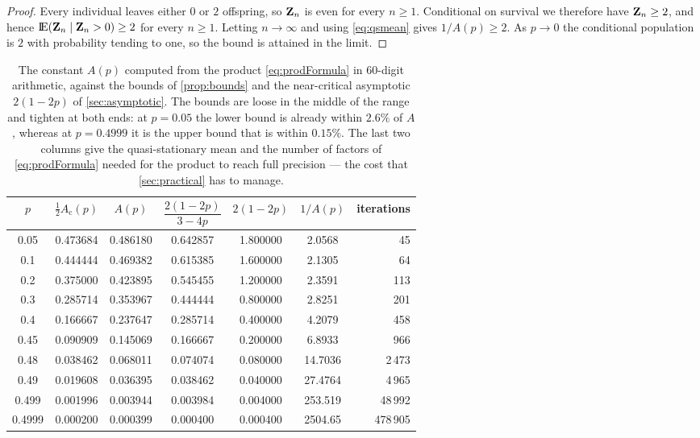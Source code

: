 \begin{proof}
Every individual leaves either $0$ or $2$ offspring, so ${\bf Z}_n$ is even for every
$n\ge1$. Conditional on survival we therefore have ${\bf Z}_n\ge2$, and hence
${\rm I}\!{\rm E}({\bf Z}_n\mid{\bf Z}_n>0)\ge2$ for every $n\ge1$. Letting $n\to\infty$ and using
\cref{eq:qsmean} gives $1/A(p)\ge2$. As $p\to0$ the conditional population is $2$ with
probability tending to one, so the bound is attained in the limit.
\end{proof}

\begin{table}[ht]
\centering
\caption{The constant $A(p)$ computed from the product \cref{eq:prodFormula} in $60$-digit
arithmetic, against the bounds of \cref{prop:bounds} and the near-critical asymptotic
$2(1-2p)$ of \cref{sec:asymptotic}. The bounds are loose in the middle of the range and
tighten at both ends: at $p=0.05$ the lower bound is already within $2.6\%$ of $A$,
whereas at $p=0.4999$ it is the upper bound that is within $0.15\%$. The last two columns
give the quasi-stationary mean and the number of factors of \cref{eq:prodFormula} needed
for the product to reach full precision --- the cost that \cref{sec:practical} has to
manage.}
\label{tab:Avals}
\begin{tabular}{ccccccr}
\toprule
$p$ & $\tfrac12 A_{\text{c}}(p)$ & $A(p)$ & $\dfrac{2(1-2p)}{3-4p}$ & $2(1-2p)$ & $1/A(p)$ & iterations\\
\midrule
0.05   & 0.473684 & 0.486180 & 0.642857 & 1.800000 & 2.0568 & 45 \\
0.1    & 0.444444 & 0.469382 & 0.615385 & 1.600000 & 2.1305 & 64 \\
0.2    & 0.375000 & 0.423895 & 0.545455 & 1.200000 & 2.3591 & 113 \\
0.3    & 0.285714 & 0.353967 & 0.444444 & 0.800000 & 2.8251 & 201 \\
0.4    & 0.166667 & 0.237647 & 0.285714 & 0.400000 & 4.2079 & 458 \\
0.45   & 0.090909 & 0.145069 & 0.166667 & 0.200000 & 6.8933 & 966 \\
0.48   & 0.038462 & 0.068011 & 0.074074 & 0.080000 & 14.7036 & 2\,473 \\
0.49   & 0.019608 & 0.036395 & 0.038462 & 0.040000 & 27.4764 & 4\,965 \\
0.499  & 0.001996 & 0.003944 & 0.003984 & 0.004000 & 253.519 & 48\,992 \\
0.4999 & 0.000200 & 0.000399 & 0.000400 & 0.000400 & 2504.65 & 478\,905 \\
\bottomrule
\end{tabular}
\end{table}

